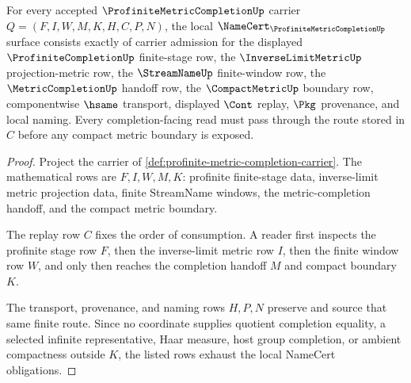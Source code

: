 \begin{theorem}
\label{thm:profinite-metric-completion-namecert-obligations}
For every accepted $\ProfiniteMetricCompletionUp$ carrier $Q=(F,I,W,M,K,H,C,P,N)$, the local $\NameCert_{\ProfiniteMetricCompletionUp}$ surface consists exactly of carrier admission for the displayed $\ProfiniteCompletionUp$ finite-stage row, the $\InverseLimitMetricUp$ projection-metric row, the $\StreamNameUp$ finite-window row, the $\MetricCompletionUp$ handoff row, the $\CompactMetricUp$ boundary row, componentwise $\hsame$ transport, displayed $\Cont$ replay, $\Pkg$ provenance, and local naming. Every completion-facing read must pass through the route stored in $C$ before any compact metric boundary is exposed.
\end{theorem}
\begin{proof}
Project the carrier of \autoref{def:profinite-metric-completion-carrier}. The mathematical rows are $F,I,W,M,K$: profinite finite-stage data, inverse-limit metric projection data, finite StreamName windows, the metric-completion handoff, and the compact metric boundary.

The replay row $C$ fixes the order of consumption. A reader first inspects the profinite stage row $F$, then the inverse-limit metric row $I$, then the finite window row $W$, and only then reaches the completion handoff $M$ and compact boundary $K$.

The transport, provenance, and naming rows $H,P,N$ preserve and source that same finite route. Since no coordinate supplies quotient completion equality, a selected infinite representative, Haar measure, host group completion, or ambient compactness outside $K$, the listed rows exhaust the local NameCert obligations.
\end{proof}


